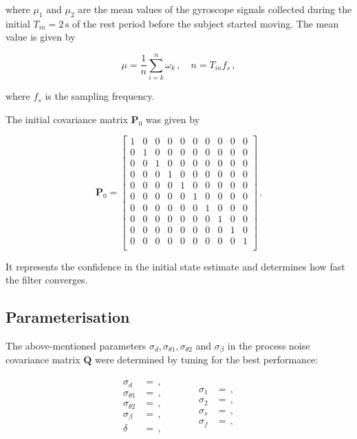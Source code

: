 \noindent
where $\mu_1$ and $\mu_2$ are the mean values of the gyroscope signals collected during the initial $T_{in}=2\,\mbox{s}$ of the rest period before the subject started moving. The mean value is given by

\begin{equation}
  \mu = \frac{1}{n} \sum_{i=k}^{n}{\omega_k}\,, \quad n = T_{in} f_s\,,
\end{equation}

\noindent
where $f_s$ is the sampling frequency.

The initial covariance matrix $\mathbf{P}_{0}$ was given by

\begin{equation}
\mathbf{P}_0 = \begin{bmatrix}
  1 & 0 & 0 & 0 & 0 & 0 & 0 & 0 & 0 & 0\\
  0 & 1 & 0 & 0 & 0 & 0 & 0 & 0 & 0 & 0\\
  0 & 0 & 1 & 0 & 0 & 0 & 0 & 0 & 0 & 0\\
  0 & 0 & 0 & 1 & 0 & 0 & 0 & 0 & 0 & 0\\
  0 & 0 & 0 & 0 & 1 & 0 & 0 & 0 & 0 & 0\\
  0 & 0 & 0 & 0 & 0 & 1 & 0 & 0 & 0 & 0\\
  0 & 0 & 0 & 0 & 0 & 0 & 1 & 0 & 0 & 0\\
  0 & 0 & 0 & 0 & 0 & 0 & 0 & 1 & 0 & 0\\
  0 & 0 & 0 & 0 & 0 & 0 & 0 & 0 & 1 & 0\\
  0 & 0 & 0 & 0 & 0 & 0 & 0 & 0 & 0 & 1\\
\end{bmatrix}\,.
\end{equation}

\noindent
It represents the confidence in the initial state estimate and determines how fast the filter converges.

\subsection{Parameterisation}

The above-mentioned parameters $\sigma_d, \sigma_{\theta 1}, \sigma_{\theta 2}$ and $\sigma_{\beta}$ in the process noise covariance matrix $\mathbf{Q}$ were determined by tuning for the best performance:

\begin{equation}
\begin{matrix}
	\begin{split}
	  \sigma_d &= \,, \\
	  \sigma_{\theta 1} &= \,, \\
	  \sigma_{\theta 2} &= \,, \\
	  \sigma_{\beta} &= \,, \\
	  \delta &= \,,
\end{split} \qquad \quad
    \begin{split}
	  \sigma_1 &= \,, \\
	  \sigma_2 &= \,, \\
	  \sigma_s &= \,, \\
	  \sigma_f &= \,,  
\end{split}
\end{matrix}
\end{equation}

